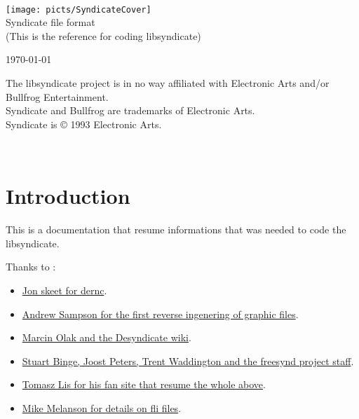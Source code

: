 \documentclass[a4paper,twoside,12pt,dvips]{article}
\begin{document}
\begin{titlepage}
  ~\vfill
  \begin{center}
    \texttt{[image: picts/SyndicateCover]}\vspace{1.5cm}\\
    {\LARGE Syndicate file format}\\
    {\small (This is the reference for coding libsyndicate)}\\
  \end{center}
  \vspace{1.5cm}  
  \begin{flushright}
    \today
  \end{flushright}
  \vfill
\end{titlepage}

\thispagestyle{empty}
\begin{center}
The libsyndicate project is in no way affiliated with Electronic Arts and/or Bullfrog Entertainment.\\
Syndicate and Bullfrog are trademarks of Electronic Arts.\\
Syndicate is \copyright{} 1993 Electronic Arts.
\end{center}
\vfill

\newpage

\tableofcontents
\newpage
\makeatletter
\if@twoside
 \ifodd\c@page~\newpage
 \fi
\fi
\makeatother

\section{Introduction}

This is a documentation that resume informations that was needed to code the libsyndicate.

Thanks to :
\begin{itemize}
\item \href{http://www.yoda.arachsys.com/dk/utils.html}{Jon skeet for dernc}.
\item \href{http://citybuilder.sourceforge.net/}{Andrew Sampson for the first reverse ingenering of graphic files}.
\item \href{http://desyndicate.pbwiki.com/}{Marcin Olak and the Desyndicate wiki}.
\item \href{http://freesynd.sourceforge.net/about.php}{Stuart Binge, Joost Peters, Trent Waddington and the freesynd project staff}.
\item \href{http://syndicate.lubie.org/siteinfo/contact.php}{Tomasz Lis for his fan site that resume the whole above}.
\item \href{ftp://ftp.mplayerhq.hu/MPlayer/samples/game-formats/magiccarpet-fli/}{Mike Melanson for details on fli files}.
\end{itemize}
\end{document}
